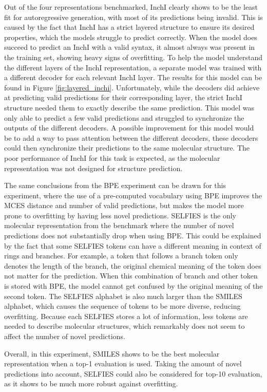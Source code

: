 Out of the four representations benchmarked, InchI clearly shows to be the least fit for autoregressive generation, with most of its predictions being invalid.
This is caused by the fact that InchI has a strict layered structure to ensure its desired properties, which the models struggle to predict correctly.
When the model does succeed to predict an InchI with a valid syntax, it almost always was present in the training set, showing heavy signs of overfitting.
To help the model understand the different layers of the InchI representation, a separate model was trained with a different decoder for each relevant InchI layer. 
The results for this model can be found in Figure \ref{fig:layered_inchi}.
Unfortunately, while the decoders did achieve at predicting valid predictions for their corresponding layer, the strict InchI structure needed them to exactly describe the same prediction.
This model was only able to predict a few valid predictions and struggled to synchronize the outputs of the different decoders.
A possible improvement for this model would be to add a way to pass attention between the different decoders, these decoders could then synchronize their predictions to the same molecular structure.
The poor performance of InchI for this task is expected, as the molecular representation was not designed for structure prediction.

The same conclusions from the \ac{BPE} experiment can be drawn for this experiment, where the use of a pre-computed vocabulary using \ac{BPE} improves the MCES distance and number of valid predictions, but makes the model more prone to overfitting by having less novel predictions.
SELFIES is the only molecular representation from the benchmark where the number of novel predictions does not substantially drop when using \ac{BPE}.
This could be explained by the fact that some SELFIES tokens can have a different meaning in context of rings and branches. 
For example, a token that follows a branch token only denotes the length of the branch, the original chemical meaning of the token does not matter for the prediction.
When this combination of branch and other token is stored with \ac{BPE}, the model cannot get confused by the original meaning of the second token.
The SELFIES alphabet is also much larger than the SMILES alphabet, which causes the sequence of tokens to be more diverse, reducing overfitting.
Because each SELFIES stores a lot of information, less tokens are needed to describe molecular structures, which remarkably does not seem to affect the number of novel predictions.

Overall, in this experiment, SMILES shows to be the best molecular representation when a top-1 evaluation is used.
Taking the amount of novel predictions into account, SELFIES could also be considered for top-10 evaluation, as it shows to be much more robust against overfitting.
